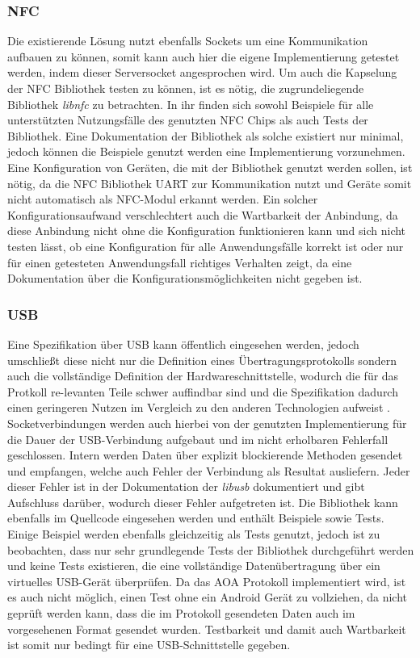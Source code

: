 		\subsubsection{NFC} Die existierende Lösung nutzt ebenfalls Sockets um eine Kommunikation aufbauen zu können, somit kann auch hier die eigene Implementierung getestet werden, indem dieser Serversocket angesprochen wird. Um auch die Kapselung der NFC Bibliothek testen zu können, ist es nötig, die zugrundeliegende Bibliothek {\it libnfc} zu betrachten. In ihr finden sich sowohl Beispiele für alle unterstützten Nutzungsfälle des genutzten NFC Chips als auch Tests der Bibliothek. Eine Dokumentation der Bibliothek als solche existiert nur minimal, jedoch können die Beispiele genutzt werden eine Implementierung vorzunehmen. Eine Konfiguration von Geräten, die mit der Bibliothek genutzt werden sollen, ist nötig, da die NFC Bibliothek UART zur Kommunikation nutzt und Geräte somit nicht automatisch als NFC-Modul erkannt werden. Ein solcher Konfigurationsaufwand verschlechtert auch die Wartbarkeit der Anbindung, da diese Anbindung nicht ohne die Konfiguration funktionieren kann und sich nicht testen lässt, ob eine Konfiguration für alle Anwendungsfälle korrekt ist oder nur für einen getesteten Anwendungsfall richtiges Verhalten zeigt, da eine Dokumentation über die Konfigurationsmöglichkeiten nicht gegeben ist. 
		
          \subsubsection{USB} Eine Spezifikation über USB kann öffentlich eingesehen werden, jedoch umschließt diese nicht nur die Definition eines Übertragungsprotokolls sondern auch die \linebreak vollständige Definition der Hardwareschnittstelle, wodurch die für das Protkoll re-levanten Teile schwer auffindbar sind und die Spezifikation dadurch einen geringeren Nutzen im Vergleich zu den anderen Technologien aufweist \cite{usbSpec}. Socketverbindungen werden auch hierbei von der genutzten Implementierung für die Dauer der USB-Verbindung aufgebaut und im nicht erholbaren Fehlerfall geschlossen. Intern werden Daten über explizit blockierende Methoden gesendet und empfangen, welche auch Fehler der Verbindung als Resultat ausliefern. Jeder dieser Fehler ist in der Dokumentation der {\it libusb} dokumentiert und gibt Aufschluss darüber, wodurch dieser Fehler aufgetreten ist. Die Bibliothek kann ebenfalls im Quellcode eingesehen werden und enthält Beispiele sowie Tests.
     Einige Beispiel werden ebenfalls gleichzeitig als Tests genutzt, jedoch ist zu beobachten, dass nur sehr grundlegende Tests der Bibliothek durchgeführt werden und keine Tests existieren, die eine vollständige Datenübertragung über ein virtuelles USB-Gerät überprüfen. Da das AOA Protokoll implementiert wird, ist es auch nicht möglich, einen Test ohne ein Android Gerät zu vollziehen, da nicht geprüft werden kann, dass die im Protokoll gesendeten Daten auch im vorgesehenen Format gesendet wurden. Testbarkeit und damit auch Wartbarkeit ist somit nur bedingt für eine USB-Schnittstelle gegeben.
		
